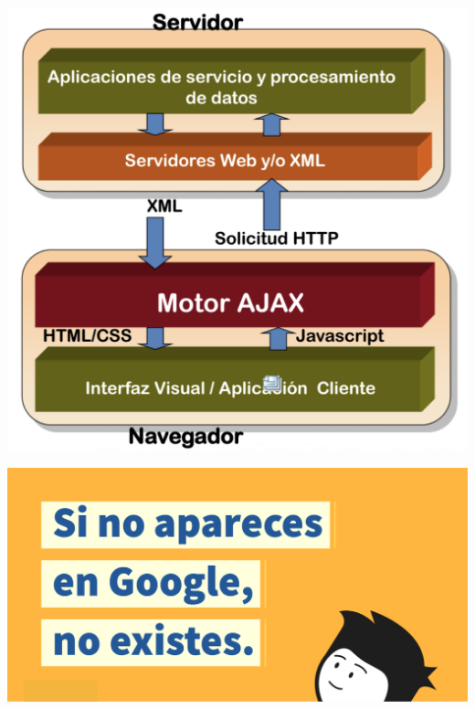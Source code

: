 \documentclass[
10pt, %
aspectratio=169, %
]{beamer}
\begin{document}
\begin{frame}
\begin{minipage}[t]{0.4\textwidth}
			\includegraphics[scale=0.35]{modelo-web2.png} 
			
		\end{minipage}
		
	\end{frame}
	
	{
		{%
			\includegraphics[width=\paperwidth,height=\paperheight]{necesidad.png}
		}
		
		\begin{frame}
		\end{frame}
	}
	
\end{document}
